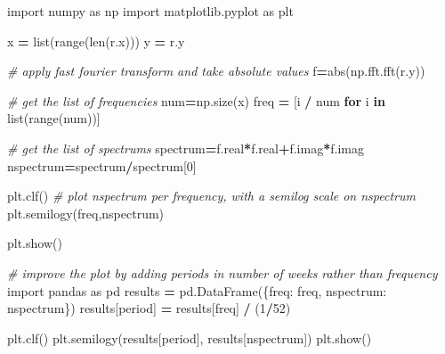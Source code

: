 \documentclass[
  paper=a4,
  ,captions=tableheading
]{scrartcl}
\newenvironment{Shaded}{\begin{snugshade}}{\end{snugshade}}
\newcommand{\BuiltInTok}[1]{#1}
\newcommand{\CommentTok}[1]{\textcolor[rgb]{0.56,0.35,0.01}{\textit{#1}}}
\newcommand{\ControlFlowTok}[1]{\textcolor[rgb]{0.13,0.29,0.53}{\textbf{#1}}}
\newcommand{\DecValTok}[1]{\textcolor[rgb]{0.00,0.00,0.81}{#1}}
\newcommand{\ImportTok}[1]{#1}
\newcommand{\KeywordTok}[1]{\textcolor[rgb]{0.13,0.29,0.53}{\textbf{#1}}}
\newcommand{\NormalTok}[1]{#1}
\newcommand{\OperatorTok}[1]{\textcolor[rgb]{0.81,0.36,0.00}{\textbf{#1}}}
\newcommand{\StringTok}[1]{\textcolor[rgb]{0.31,0.60,0.02}{#1}}
\begin{document}
\begin{Shaded}
\begin{Highlighting}[]
\ImportTok{import}\NormalTok{ numpy }\ImportTok{as}\NormalTok{ np}
\ImportTok{import}\NormalTok{ matplotlib.pyplot }\ImportTok{as}\NormalTok{ plt}
 
\NormalTok{x }\OperatorTok{=} \BuiltInTok{list}\NormalTok{(}\BuiltInTok{range}\NormalTok{(}\BuiltInTok{len}\NormalTok{(r.x)))}
\NormalTok{y }\OperatorTok{=}\NormalTok{ r.y}

\CommentTok{\# apply fast fourier transform and take absolute values}
\NormalTok{f}\OperatorTok{=}\BuiltInTok{abs}\NormalTok{(np.fft.fft(r.y))}

\CommentTok{\# get the list of frequencies}
\NormalTok{num}\OperatorTok{=}\NormalTok{np.size(x)}
\NormalTok{freq }\OperatorTok{=}\NormalTok{ [i }\OperatorTok{/}\NormalTok{ num }\ControlFlowTok{for}\NormalTok{ i }\KeywordTok{in} \BuiltInTok{list}\NormalTok{(}\BuiltInTok{range}\NormalTok{(num))]}

\CommentTok{\# get the list of spectrums}
\NormalTok{spectrum}\OperatorTok{=}\NormalTok{f.real}\OperatorTok{*}\NormalTok{f.real}\OperatorTok{+}\NormalTok{f.imag}\OperatorTok{*}\NormalTok{f.imag}
\NormalTok{nspectrum}\OperatorTok{=}\NormalTok{spectrum}\OperatorTok{/}\NormalTok{spectrum[}\DecValTok{0}\NormalTok{]}


\NormalTok{plt.clf()}
\CommentTok{\# plot nspectrum per frequency, with a semilog scale on nspectrum}
\NormalTok{plt.semilogy(freq,nspectrum)}


\NormalTok{plt.show()}
\end{Highlighting}
\end{Shaded}

\begin{Shaded}
\begin{Highlighting}[]
\CommentTok{\# improve the plot by adding periods in number of weeks rather than  frequency}
\ImportTok{import}\NormalTok{ pandas }\ImportTok{as}\NormalTok{ pd}
\NormalTok{results }\OperatorTok{=}\NormalTok{ pd.DataFrame(\{}\StringTok{\textquotesingle{}freq\textquotesingle{}}\NormalTok{: freq, }\StringTok{\textquotesingle{}nspectrum\textquotesingle{}}\NormalTok{: nspectrum\})}
\NormalTok{results[}\StringTok{\textquotesingle{}period\textquotesingle{}}\NormalTok{] }\OperatorTok{=}\NormalTok{ results[}\StringTok{\textquotesingle{}freq\textquotesingle{}}\NormalTok{] }\OperatorTok{/}\NormalTok{ (}\DecValTok{1}\OperatorTok{/}\DecValTok{52}\NormalTok{)}

\NormalTok{plt.clf()}
\NormalTok{plt.semilogy(results[}\StringTok{\textquotesingle{}period\textquotesingle{}}\NormalTok{], results[}\StringTok{\textquotesingle{}nspectrum\textquotesingle{}}\NormalTok{])}
\NormalTok{plt.show()}
\end{Highlighting}
\end{Shaded}
\end{document}
